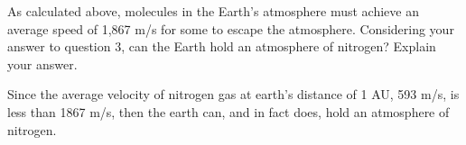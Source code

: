 \documentclass[../astro_4]{subfiles}
\begin{document}
\begin{problem}
As calculated above, molecules in the Earth's atmosphere must achieve an average speed of 1,867 m/s for some to escape the atmosphere. Considering your answer to question 3, can the Earth hold an atmosphere of nitrogen?
Explain your answer.
\end{problem}
Since the average velocity of nitrogen gas at earth's distance of 1 AU, 593 m/s, is less than 1867 m/s, then the earth can, and in fact does, hold an atmosphere of nitrogen.
\end{document}
